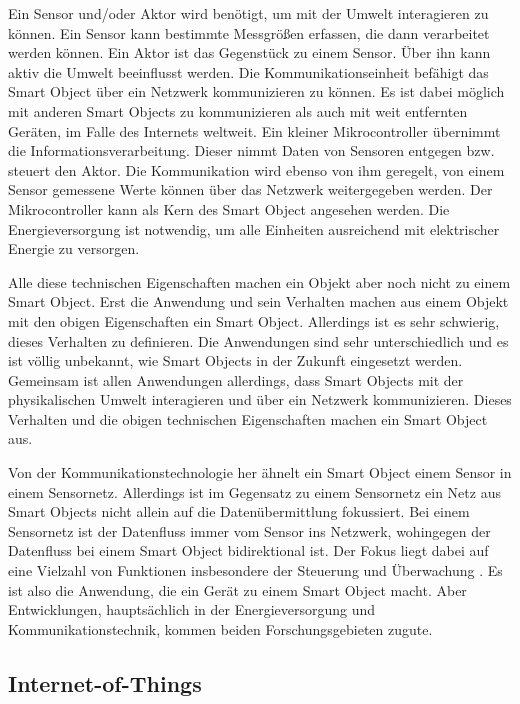 Ein Sensor und/oder Aktor wird benötigt, um mit der Umwelt interagieren zu können. Ein Sensor kann bestimmte Messgrößen erfassen, die dann verarbeitet werden können. Ein Aktor ist das Gegenstück zu einem Sensor. Über ihn kann aktiv die Umwelt beeinflusst werden. Die Kommunikationseinheit befähigt das Smart Object über ein Netzwerk kommunizieren zu können. Es ist dabei möglich mit anderen Smart Objects zu kommunizieren als auch mit weit entfernten Geräten, im Falle des Internets weltweit. Ein kleiner Mikrocontroller übernimmt die Informationsverarbeitung. Dieser nimmt Daten von Sensoren entgegen bzw. steuert den Aktor. Die Kommunikation wird ebenso von ihm geregelt, von einem Sensor gemessene Werte können über das Netzwerk weitergegeben werden. Der Mikrocontroller kann als Kern des Smart Object angesehen werden. Die Energieversorgung ist notwendig, um alle Einheiten ausreichend mit elektrischer Energie zu versorgen.

Alle diese technischen Eigenschaften machen ein Objekt aber noch nicht zu einem Smart Object. Erst die Anwendung und sein Verhalten machen aus einem Objekt mit den obigen Eigenschaften ein Smart Object. Allerdings ist es sehr schwierig, dieses Verhalten zu definieren. Die Anwendungen sind sehr unterschiedlich und es ist völlig unbekannt, wie Smart Objects in der Zukunft eingesetzt werden. Gemeinsam ist allen Anwendungen allerdings, dass Smart Objects mit der physikalischen Umwelt interagieren und über ein Netzwerk kommunizieren. Dieses Verhalten und die obigen technischen Eigenschaften machen ein Smart Object aus.

Von der Kommunikationstechnologie her ähnelt ein Smart Object einem Sensor in einem Sensornetz. Allerdings ist im Gegensatz zu einem Sensornetz ein Netz aus Smart Objects nicht allein auf die Datenübermittlung fokussiert. Bei einem Sensornetz ist der Datenfluss immer vom Sensor ins Netzwerk, wohingegen der Datenfluss bei einem Smart Object bidirektional ist. Der Fokus liegt dabei auf eine Vielzahl von Funktionen insbesondere der Steuerung und Überwachung \citep[Seite 12]{vasseur10interconnecting}. Es ist also die Anwendung, die ein Gerät zu einem Smart Object macht. Aber Entwicklungen, hauptsächlich in der Energieversorgung und Kommunikationstechnik, kommen beiden Forschungsgebieten zugute.


\subsection{Internet-of-Things}

